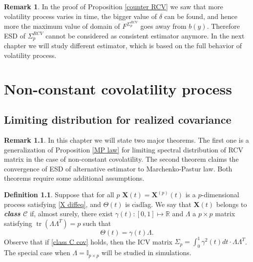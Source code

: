 \documentclass[a4paper,11pt]{book}
\theoremstyle{plain}
\theoremstyle{definition}
\newtheorem{defn}[thm]{Definition}
\newtheorem{rmrk}[thm]{Remark}
\newcommand{\MR}{\mathbb{R}}
\newcommand{\tr}{\operatorname{tr}}
\newcommand{\define}[1]{\textit{\textbf{#1}}}
\begin{document}
    \begin{rmrk}
    	In the proof of Proposition \ref{counter RCV} we saw that more volatility process varies in time, the bigger value of $\delta$ can be found, and hence more the maximum value of domain of $F^{\Sigma_p^{RCV}}$ goes away from $b(y)$. Therefore ESD of $\Sigma_p^{RCV}$ cannot be considered as consistent estimator anymore. In the next chapter we will study different estimator, which is based on the full behavior of volatility process.
    \end{rmrk}
    
    \chapter{Non-constant covolatility process}
    
    \section{Limiting distribution for realized covariance}
    \begin{rmrk}
    	In this chapter we will state two major theorems. The first one is a generalization of Proposition \ref{MP law} for limiting spectral distribution of RCV matrix in the case of non-constant covolatility. The second theorem claims the convergence of ESD of alternative estimator to Marchenko-Pastur law. Both theorems require some additional assumptions.
    \end{rmrk}
    
    
    \begin{defn}
    	Suppose that for all $p$ $\mathbf{X}(t) = \mathbf{X}^{(p)}(t)$ is a $p$-dimensional process satisfying \eqref{X diffeq}, and $\Theta(t)$ is c$\grave{\text{a}}$dl$\grave{\text{a}}$g. We say that $\mathbf{X}(t)$ belongs to \define{class $\mathcal{C}$} if, almost surely, there exist $\gamma(t): [0, 1] \mapsto \MR$ and $\Lambda$ a $p \times p$ matrix satisfying $\tr(\Lambda \Lambda^T) = p$ such that 
    	\begin{equation} \label{class C cov}
    	\Theta(t) = \gamma(t) \Lambda.
    	\end{equation}
    	Observe that if \eqref{class C cov} holds, then the ICV matrix $\Sigma_p = \int_{0}^{1} \gamma^2(t) dt \cdot \Lambda \Lambda^T$. The special case when $\Lambda = \mathbb{I}_{p \times p}$ will be studied in simulations.
    \end{defn}
    
\end{document}
